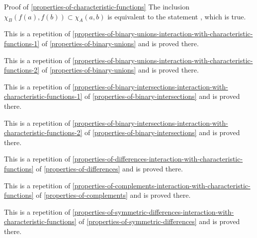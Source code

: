 \begin{Proof}{Proof of \cref{properties-of-characteristic-functions}}%
    The inclusion $\chi_{B}(f(a),f(b))\subset\chi_{A}(a,b)$ is equivalent to the statement , which is true.

    This is a repetition of \cref{properties-of-binary-unions-interaction-with-characteristic-functions-1} of \cref{properties-of-binary-unions} and is proved there.

    This is a repetition of \cref{properties-of-binary-unions-interaction-with-characteristic-functions-2} of \cref{properties-of-binary-unions} and is proved there.

    This is a repetition of \cref{properties-of-binary-intersections-interaction-with-characteristic-functions-1} of \cref{properties-of-binary-intersections} and is proved there.

    This is a repetition of \cref{properties-of-binary-intersections-interaction-with-characteristic-functions-2} of \cref{properties-of-binary-intersections} and is proved there.

    This is a repetition of \cref{properties-of-differences-interaction-with-characteristic-functions} of \cref{properties-of-differences} and is proved there.

    This is a repetition of \cref{properties-of-complements-interaction-with-characteristic-functions} of \cref{properties-of-complements} and is proved there.

    This is a repetition of \cref{properties-of-symmetric-differences-interaction-with-characteristic-functions} of \cref{properties-of-symmetric-differences} and is proved there.


\end{Proof}
